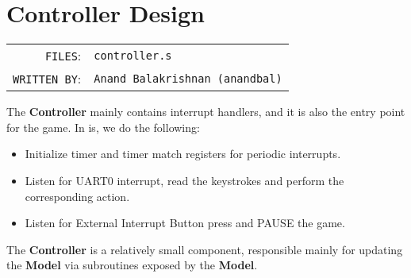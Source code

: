 \section{Controller Design}

  \begin{table}[H]
  \begin{tabular}{rl}
    \texttt{FILES}:         &\texttt{controller.s}  \\
    \texttt{WRITTEN BY}:    &\texttt{Anand Balakrishnan (anandbal)}
  \end{tabular}
  \end{table}


  The \textbf{Controller} mainly contains interrupt handlers, and it is also the entry point for the game.
  In is, we do the following:

  \begin{itemize}
    \item Initialize timer and timer match registers for periodic interrupts.
    \item Listen for UART0 interrupt, read the keystrokes and perform the corresponding action.
    \item Listen for External Interrupt Button press and PAUSE the game.
  \end{itemize}

  The \textbf{Controller} is a relatively small component, responsible mainly for updating the \textbf{Model} via subroutines exposed by the \textbf{Model}.


